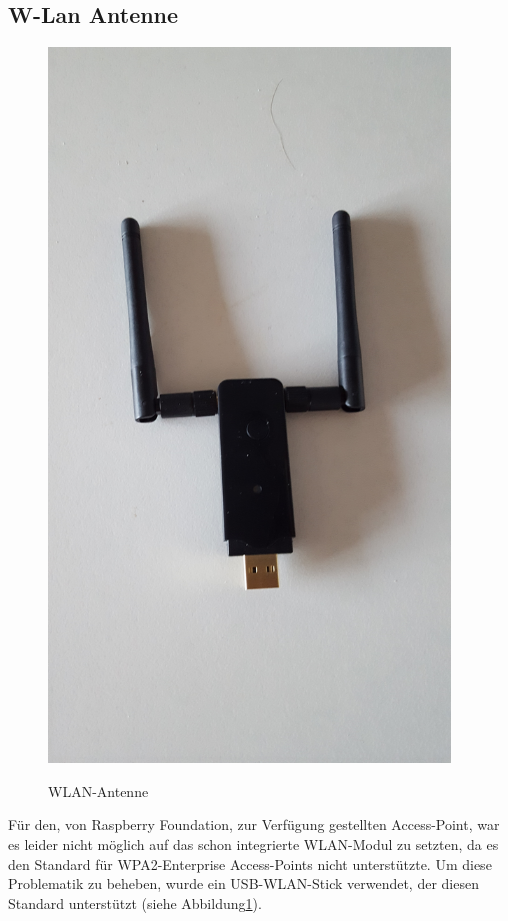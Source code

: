 \subsection{W-Lan Antenne}
    	\begin{figure}[H]
		\centering
		\includegraphics[width=0.95\textwidth]{images/raspberry_aufbau/WlanAntenne.jpg}
        \label{fig:wlan}
		\caption{WLAN-Antenne}
	\end{figure}
Für den, von Raspberry Foundation, zur Verfügung gestellten Access-Point, war es leider nicht möglich auf das schon integrierte WLAN-Modul zu setzten, da es den Standard für WPA2-Enterprise Access-Points nicht unterstützte. Um diese Problematik zu beheben, wurde ein USB-WLAN-Stick verwendet, der diesen Standard unterstützt (siehe Abbildung\ref{fig:wlan}).
